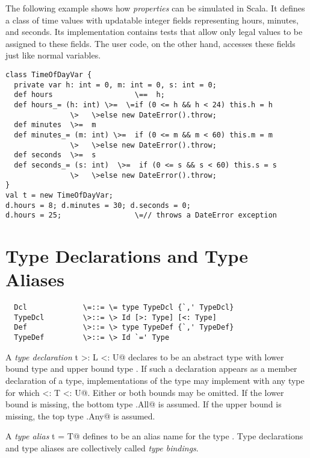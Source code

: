 \documentclass[11pt]{report}
\begin{document}
\example The following example shows how {\em properties} can be
simulated in Scala. It defines a class \verb@TimeOfDayVar@ of time
values with updatable integer fields representing hours, minutes, and
seconds. Its implementation contains tests that allow only legal
values to be assigned to these fields. The user code, on the other
hand, accesses these fields just like normal variables.

\begin{verbatim}
class TimeOfDayVar {
  private var h: int = 0, m: int = 0, s: int = 0;
  def hours                   \==  h;
  def hours_= (h: int) \>=  \=if (0 <= h && h < 24) this.h = h
		       \>   \>else new DateError().throw;
  def minutes  \>=  m
  def minutes_= (m: int) \>=  if (0 <= m && m < 60) this.m = m
		       \>   \>else new DateError().throw;
  def seconds  \>=  s
  def seconds_= (s: int)  \>=  if (0 <= s && s < 60) this.s = s
		       \>   \>else new DateError().throw;
}
val t = new TimeOfDayVar;
d.hours = 8; d.minutes = 30; d.seconds = 0;
d.hours = 25;                 \=// throws a DateError exception
\end{verbatim}

\section{Type Declarations and Type Aliases}
\label{sec:typedcl}
\label{sec:typealias}

\syntax\begin{verbatim}
  Dcl             \=::= \= type TypeDcl {`,' TypeDcl}
  TypeDcl         \>::= \> Id [>: Type] [<: Type]
  Def             \>::= \> type TypeDef {`,' TypeDef}
  TypeDef         \>::= \> Id `=' Type
\end{verbatim}

A {\em type declaration} \verb@type t >: L <: U@ declares \verb@t@ to
be an abstract type with lower bound type \verb@L@ and upper bound
type \verb@U@.  If such a declaration appears as a member declaration
of a type, implementations of the type may implement \verb@t@ with any
type \verb@T@ for which \verb@L <: T <: U@. Either or both bounds may
be omitted.  If the lower bound \verb@L@ is missing, the bottom type
\verb@scala.All@ is assumed.  If the upper bound \verb@U@ is missing,
the top type \verb@scala.Any@ is assumed.

A {\em type alias} \verb@type t = T@ defines \verb@t@ to be an alias
name for the type \verb@T@. Type declarations and type aliases are
collectively called {\em type bindings}.
\end{document}
